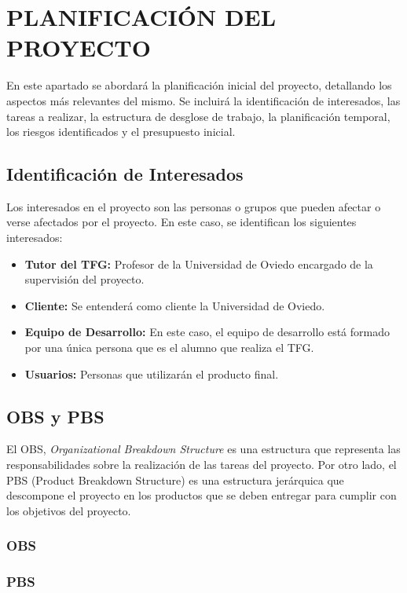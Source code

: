 \section{PLANIFICACIÓN DEL PROYECTO}
En este apartado se abordará la planificación inicial del proyecto, detallando los aspectos más relevantes del mismo. 
Se incluirá la identificación de interesados, las tareas a realizar, la estructura de desglose de trabajo, la planificación temporal, los riesgos identificados y el presupuesto inicial.

\subsection{Identificación de Interesados}
Los interesados en el proyecto son las personas o grupos que pueden afectar o verse afectados por el proyecto. En este caso, se identifican los siguientes interesados:
\begin{itemize}
    \item \textbf{Tutor del TFG:} Profesor de la Universidad de Oviedo encargado de la supervisión del proyecto.
    \item \textbf{Cliente:} Se entenderá como cliente la Universidad de Oviedo.
    \item \textbf{Equipo de Desarrollo:} En este caso, el equipo de desarrollo está formado por una única persona que es el alumno que realiza el TFG.
    \item \textbf{Usuarios:} Personas que utilizarán el producto final.
\end{itemize}

\subsection{OBS y PBS}
El OBS, \textit{Organizational Breakdown Structure} es una estructura que representa las responsabilidades sobre la realización de las tareas del proyecto. 
Por otro lado, el PBS (Product Breakdown Structure) es una estructura jerárquica que descompone el proyecto en los productos que se deben entregar para cumplir con los objetivos del proyecto.

\subsubsection{OBS}


\subsubsection{PBS}


